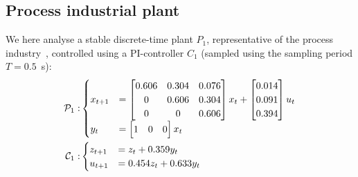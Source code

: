 \subsection{Process industrial plant}\label{sec:eval:stable}
We here analyse a stable discrete-time plant $P_1$, representative of the process industry~\cite{Hagglund:2002}, controlled using a PI-controller $C_1$ (sampled using the sampling period $T = 0.5$~s):
\begin{equation*}%
    {%
    \begin{aligned}
        \plant_1: &
        \begin{cases}
            x_{t+1} &= \begin{bmatrix}
                0.606 & 0.304 & 0.076 \\
                0 & 0.606 & 0.304 \\
                0 & 0 & 0.606 \\
            \end{bmatrix} x_t + \begin{bmatrix}
                0.014 \\
                0.091 \\
                0.394 \\
            \end{bmatrix} u_t \\
            y_t &= \begin{bmatrix}
                1 & 0 & 0
            \end{bmatrix} x_t
        \end{cases} \\
        \ctrler_1: &
        \begin{cases}
            z_{t+1} &= z_t + 0.359 y_t \\
            u_{t+1} &= 0.454 z_t + 0.633 y_t
        \end{cases}
    \end{aligned}
    }
\end{equation*}

\afterpage{
    \clearpage
    \begin{landscape}
        
    \end{landscape}
    \clearpage
}
\afterpage{
    \clearpage
    \begin{landscape}
        
    \end{landscape}
    \clearpage
}

